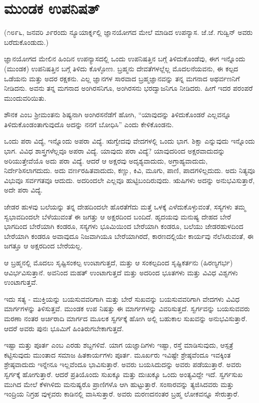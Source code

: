 
\chapter{ಮುಂಡಕ ಉಪನಿಷತ್}

(೧೮೯೬, ಜನವರಿ ೨೯ರಂದು ನ್ಯೂಯಾರ್ಕ್ನಲ್ಲಿ ಜ್ಞಾನಯೋಗದ ಮೇಲೆ ಮಾಡಿದ ಉಪನ್ಯಾಸ. ಜೆ.ಜೆ. ಗುಡ್ವಿನ್ ಅವರು ಬರೆದುಕೊಂಡುದು.)

ಜ್ಞಾನಯೋಗದ ಮೇಲಿನ ಹಿಂದಿನ ಉಪನ್ಯಾಸದಲ್ಲಿ ಒಂದು ಉಪನಿಷತ್ತಿನ ಬಗ್ಗೆ ತಿಳಿದುಕೊಂಡೆವು, ಈಗ ಇನ್ನೊಂದು (ಮುಂಡಕ) ಉಪನಿಷತ್ತಿನ ಬಗ್ಗೆ ತಿಳಿದು ಕೊಳ್ಳೋಣ. ಬ್ರಹ್ಮನು ದೇವತೆಗಳಲ್ಲೆಲ್ಲ ಮೊದಲನೆಯವನು, ಈ ಕಲ್ಪದ ಒಡೆಯನು ಮತ್ತು ಅದರ ರಕ್ಷಕನು. ಎಲ್ಲ ಜ್ಞಾನಗಳ ಸಾರವಾದ ಬ್ರಹ್ಮಜ್ಞಾನವನ್ನು ತನ್ನ ಮಗನಾದ ಅಥರ್ವಣನಿಗೆ ನೀಡಿದನು. ಅವನು ತನ್ನ ಮಗನಾದ ಅಂಗಿರಸನಿಗೂ, ಅಂಗಿರಸನು ಭರದ್ವಾಜನಿಗೂ ನೀಡಿದರು. ಹೀಗೆ ಇದರ ಪರಂಪರೆ ಮುಂದುವರಿಯಿತು.

ಶೌನಕ ಎಂಬ ಶ‍್ರೀಮಂತನು ಶಿಷ್ಯನಾಗಿ ಅಂಗಿರಸನೆಡೆಗೆ ಹೋಗಿ, “ಯಾವುದನ್ನು ತಿಳಿದುಕೊಂಡರೆ ಎಲ್ಲವನ್ನೂ ತಿಳಿದುಕೊಂಡಂತಾಗುವುದೊ ಅದನ್ನು ನನಗೆ ಬೋಧಿಸಿ” ಎಂದು ಕೇಳಿಕೊಂಡನು.

ಒಂದು ಪರಾ ವಿದ್ಯೆ, ಇನ್ನೊಂದು ಅಪರಾ ವಿದ್ಯೆ. ಋಗ್ವೇದವು ವೇದಗಳಲ್ಲಿ ಒಂದು ಭಾಗ. ಶಿಕ್ಷಾ ಎನ್ನುವುದು ಇನ್ನೊಂದು ಭಾಗ. ವಿವಿಧ ಶಾಸ್ತ್ರಗಳೆಲ್ಲವೂ ಅಪರಾ ವಿದ್ಯೆ. ಯಾವುದು ಪರಾ ವಿದ್ಯೆ? ಯಾವುದರಿಂದ ಅಕ್ಷರವಾದುದನ್ನು ಅರಿಯುತ್ತೇವೆಯೊ ಅದು ಪರಾ ವಿದ್ಯೆ. ಆದರೆ ಆ ಅಕ್ಷರವು ಅದೃಶ್ಯವಾದುದು, ಅಗ್ರಾಹ್ಯವಾದುದು, ನಿರ್ದೇಶಿಸಲಾಗದುದು. ಅದು ವರ್ಣರಹಿತವಾದುದು, ಕಣ್ಣು, ಕಿವಿ, ಮೂಗು, ಪಾಣಿ, ಪಾದಗಳಿಲ್ಲದುದು. ಅದು ನಿತ್ಯವೂ ವಿಭುವೂ ಸರ್ವಗತವೂ ಆದುದು. ಅದರಿಂದಲೇ ಎಲ್ಲವೂ ಹುಟ್ಟಿಬಂದಿರುವುದು. ಋಷಿಗಳು ಅದನ್ನು ಅನುಭವಿಸುತ್ತಾರೆ, ಅದೇ ಪರಾ ವಿದ್ಯೆ.

ಜೇಡರ ಹುಳವು ಬಲೆಯನ್ನು ತನ್ನ ದೇಹದಿಂದಲೇ ಹೊರತೆಗೆದು ಮತ್ತೆ ಒಳಕ್ಕೆ ಎಳೆದುಕೊಳ್ಳುವಂತೆ, ಸಸ್ಯಗಳು ತಮ್ಮ ಸ್ವಭಾವದಿಂದಲೇ ಬೆಳೆಯುವಂತೆ ಈ ಜಗತ್ತು ಆ ಅಕ್ಷರದಿಂದ ಬಂದಿದೆ. ಹೃದಯವು ಮನುಷ್ಯ ದೇಹದ ಬೇರೆ ಭಾಗದಿಂದ ಬೇರೆಯಾಗಿ ಕಂಡರೂ, ಸಸ್ಯಗಳು ಭೂಮಿಯಿಂದ ಬೇರೆಯಾಗಿ ಕಂಡರೂ, ಬಲೆಯು ಜೇಡರಹುಳದಿಂದ ಬೇರೆಯಾಗಿ ಕಂಡರೂ ಅವಾವುದೂ ನಿಜವಾಗಿಯೂ ಬೇರೆಯಾಗಿರದೆ, ಕಾರಣದಲ್ಲಿಯೇ ಕಾರ್ಯವು ನೆಲೆಸಿರುವಂತೆ, ಈ ಜಗತ್ತೂ ಆ ಅಕ್ಷರದಿಂದ ಬೇರೆಯಲ್ಲ.

ಆ ಬ್ರಹ್ಮನಲ್ಲಿ ಮೊದಲು ಸೃಷ್ಟಿಸಂಕಲ್ಪ ಉಂಟಾಗುತ್ತದೆ, ಮತ್ತು ಆ ಸಂಕಲ್ಪದಿಂದ ಸೃಷ್ಟಿಕರ್ತನು (ಹಿರಣ್ಯಗರ್ಭ) ಆವಿರ್ಭವಿಸುತ್ತಾನೆ. ಅವನಿಂದ ಮಹತ್ ಉಂಟಾಗುತ್ತದೆ ಮತ್ತು ಅದರಿಂದ ಭೂತಗಳು ಮತ್ತು ವಿವಿಧ ವಿಶ್ವಗಳು ಉಂಟಾಗುತ್ತವೆ.

ಇದು ಸತ್ಯ - ಮುಕ್ತಿಯನ್ನು ಬಯಸುವವರಿಗಾಗಿ ಮತ್ತು ಬೇರೆ ಸುಖವನ್ನು ಬಯಸುವವರಿಗಾಗಿ ವೇದಗಳು ವಿವಿಧ ಮಾರ್ಗಗಳನ್ನು ತಿಳಿಸುತ್ತವೆ. ಮುಂಡಕ ಉಪ ನಿಷತ್ತು ಈ ಮಾರ್ಗಗಳನ್ನು ವಿವರಿಸುತ್ತದೆ. ಸ್ವರ್ಗವನ್ನು ಬಯಸುವವರು ಮರಣಾ ನಂತರ ಅರ್ಚಿರಾದಿ ಮಾರ್ಗದ ಮೂಲಕ ಸ್ವರ್ಗಕ್ಕೆ ಹೋಗಿ ಅಲ್ಲಿ ಬಹುಕಾಲ ಸುಖವನ್ನು ಅನುಭವಿಸುತ್ತಾರೆ. ಆದರೆ ಅವರು ಪುನಃ ಭೂಮಿಗೆ ಹಿಂತಿರುಗಬೇಕಾಗುತ್ತದೆ.

ಇಷ್ಟಾ ಮತ್ತು ಪೂರ್ತ ಎಂಬ ಎರಡು ಶಬ್ದಗಳಿವೆ. ಯಾಗ ಯಜ್ಞಾದಿಗಳು ಇಷ್ಟಾ, ರಸ್ತೆ ಮಾಡಿಸುವುದು, ಆಸ್ಪತ್ರೆ ಕಟ್ಟಿಸುವುದು ಮುಂತಾದ ಸಮಾಜ ಹಿತಕಾರ್ಯಗಳು ಪೂರ್ತ. ಮೂರ್ಖರು ಇವಿಷ್ಟೇ ಶ್ರೇಷ್ಠವೆಂದೂ ಇವಕ್ಕಿಂತ ಶ್ರೇಷ್ಠವಾದುದು ಇನ್ನೇನೂ ಇಲ್ಲವೆಂದೂ ಭಾವಿಸುತ್ತಾರೆ. ಅವರು ಬಯಸಿದುದನ್ನು ಅವರು ಪಡೆಯುತ್ತಾರೆ. ಅವರು ಸ್ವರ್ಗಕ್ಕೆ ಹೋಗುತ್ತಾರೆ. ಆದರೆ ಪ್ರತಿಯೊಂದು ಸುಖಕ್ಕೂ ಮತ್ತು ದುಃಖಕ್ಕೂ ಒಂದು ಅಂತ್ಯವಿದ್ದೇ ಇದೆ. ಸ್ವರ್ಗಸುಖ ಮುಗಿದ ಮೇಲೆ ಕೆಳಗಿಳಿದು ಮನುಷ್ಯರೊ ಪ್ರಾಣಿಗಳೊ ಆಗಿ ಹುಟ್ಟುತ್ತಾರೆ. ಸಂಸಾರವನ್ನು ತ್ಯಜಿಸಿದವರು ಮತ್ತು ಇಂದ್ರಿಯ ನಿಗ್ರಹ ವುಳ್ಳವರು ಕಾಡಿನಲ್ಲಿ ವಾಸಿಸುತ್ತಾರೆ. ಅವರು ಮರಣದನಂತರ ಬ್ರಹ್ಮ ಲೋಕವನ್ನೂ ಸೇರುತ್ತಾರೆ.

